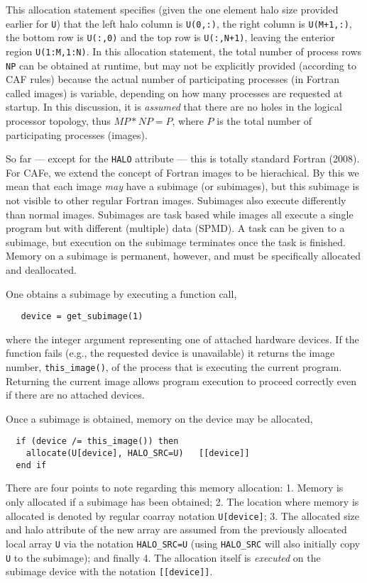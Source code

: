 This allocation statement specifies (given the one element halo size provided earlier for
\texttt{U}) that the left halo column is \texttt{U(0,:)}, the right column is \texttt{U(M+1,:)}, the
bottom row is \texttt{U(:,0)} and the top row is \texttt{U(:,N+1)}, leaving the enterior region
\texttt{U(1:M,1:N)}.  In this allocation statement, the total number of process rows \texttt{NP} can
be obtained at runtime, but may not be explicitly provided (according to CAF rules) because the
actual number of participating processes (in Fortran called images) is variable, depending on how
many processes are requested at startup.  In this discussion, it is \emph{assumed} that there are no
holes in the logical processor topology, thus $MP*NP = P$, where $P$ is the total number of
participating processes (images).

So far --- except for the \texttt{HALO} attribute --- this is totally standard Fortran (2008).  For CAFe,
we extend the concept of Fortran images to be hierachical.  By this we mean that each image \emph{may}
have a subimage (or subimages), but this subimage is not visible to other regular Fortran images.
Subimages also execute differently than normal images.  Subimages are task based while images all
execute a single program but with different (multiple) data (SPMD).  A task can be given to a subimage,
but execution on the subimage terminates once the task is finished.  Memory on a subimage is
permanent, however, and must be specifically allocated and deallocated.

One obtains a subimage by executing a function call,
\begin{verbatim}
   device = get_subimage(1)
\end{verbatim}
where the integer argument representing one of attached hardware devices.  If the function
fails (e.g., the requested device is unavailable) it returns the image number,
\texttt{this\_image()}, of the process that is executing the current program.  Returning
the current image allows program execution to proceed correctly even if there are no
attached devices.

Once a subimage is obtained, memory on the device may be allocated,
\begin{verbatim}
  if (device /= this_image()) then
    allocate(U[device], HALO_SRC=U)   [[device]]
  end if
\end{verbatim}
There are four points to note regarding this memory allocation: 1. Memory is only allocated if a
subimage has been obtained; 2. The location where memory is allocated is denoted by regular coarray
notation \texttt{U[device]}; 3. The allocated size and halo attribute of the new array are assumed
from the previously allocated local array \texttt{U} via the notation \texttt{HALO\_SRC=U} (using
\texttt{HALO\_SRC} will also initially copy \texttt{U} to the subimage); and finally 4. The
allocation itself is \emph{executed} on the subimage device with the notation \texttt{[[device]]}.

